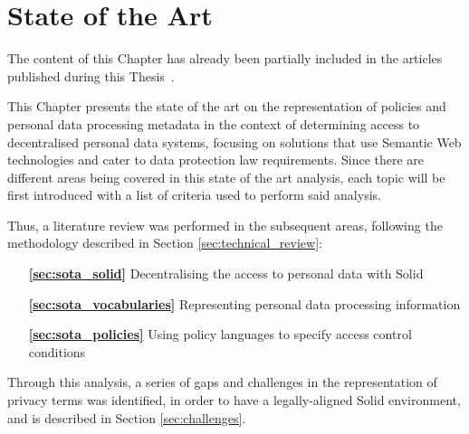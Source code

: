 \chapter{State of the Art}
\label{chap:sota}

\begin{tcolorbox}[colback=royallavender!40]
The content of this Chapter has already been partially included in the articles published during this Thesis~\citep{esteves_odrl_2021,esteves_analysis_2022,asgarinia_who_2023,esteves_using_2023,florea_is_2023}.
\end{tcolorbox}

This Chapter presents the state of the art on the representation of policies and personal data processing metadata in the context of determining access to decentralised personal data systems, focusing on solutions that use Semantic Web technologies and cater to data protection law requirements.
Since there are different areas being covered in this state of the art analysis, each topic will be first introduced with a list of criteria used to perform said analysis. 

Thus, a literature review was performed in the subsequent areas, following the methodology described in Section \ref{sec:technical_review}:

\begin{itemize}
    \item [\textbf{\ref{sec:sota_solid}}] Decentralising the access to personal data with Solid
    \item [\textbf{\ref{sec:sota_vocabularies}}] Representing personal data processing information
    \item [\textbf{\ref{sec:sota_policies}}] Using policy languages to specify access control conditions
\end{itemize}

Through this analysis, a series of gaps and challenges in the representation of privacy terms was identified, in order to have a legally-aligned Solid environment, and is described in Section \ref{sec:challenges}.





